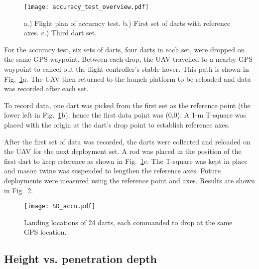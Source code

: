 \begin{figure} \centering
  {\texttt{[image: accuracy\_test\_overview.pdf]}}
 \caption{a.) Flight plan of accuracy test. b.) First set of darts with reference axes. c.) Third dart set. } 
 \label{fig:Accu_test_darts}
\end{figure}

For the accuracy test, six sets of darts, four darts in each set, were dropped on the same GPS waypoint. Between each drop, the UAV travelled to a nearby GPS waypoint to cancel out the flight controller's stable hover.  This path is shown in Fig.~\ref{fig:Accu_test_darts}a. The UAV then returned to the launch platform to be reloaded and data was recorded after each set.

To record data, one dart was picked from the first set as the reference point (the lower left in Fig.~\ref{fig:Accu_test_darts}b), hence the first data point was (0,0). A 1-m T-square was placed with the origin at the dart's drop point to establish reference axes.

After the first set of data was recorded, the darts were collected and reloaded on the UAV for the next deployment set.
 A rod was placed in the position of the first dart to keep reference as shown in Fig.~\ref{fig:Accu_test_darts}c. 
 The T-square was kept in place and mason twine was suspended to lengthen the reference axes. 
 Future deployments were measured  using the reference point and axes. 
  Results are shown in Fig.~\ref{fig:SD_accu.pdf}.


\begin{figure} \centering
  {\texttt{[image: SD\_accu.pdf]}}
 \caption{Landing locations of 24 darts, each commanded to drop at the same GPS location. 
 \label{fig:SD_accu.pdf}}
\end{figure}


\subsection{Height vs. penetration depth}

